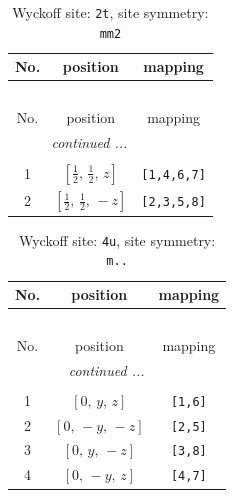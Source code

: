 \documentclass[fleqn,8pt]{jsarticle}
\begin{document}
\renewcommand{\arraystretch}{1.2}
\begin{longtable}{ccc}
\caption{Wyckoff site: {\tt 2t}, site symmetry: {\tt mm2}}
 \\
 \hline \hline
No. & position & mapping \\ \hline \endfirsthead

\multicolumn{2}{l}{\tablename\ \thetable{}} \\
 \hline \hline
No. & position & mapping \\ \hline \endhead

 \hline \hline
\multicolumn{2}{r}{\footnotesize\it continued ...} \\ \endfoot

 \hline \hline
\multicolumn{2}{r}{} \\ \endlastfoot

1 & $\left[ \frac{1}{2},\, \frac{1}{2},\, z \right]$ & {\tt [1,4,6,7]} \\ \hline
2 & $\left[ \frac{1}{2},\, \frac{1}{2},\, - z \right]$ & {\tt [2,3,5,8]} \\
\end{longtable}
\renewcommand{\arraystretch}{1.2}
\begin{longtable}{ccc}
\caption{Wyckoff site: {\tt 4u}, site symmetry: {\tt m..}}
 \\
 \hline \hline
No. & position & mapping \\ \hline \endfirsthead

\multicolumn{2}{l}{\tablename\ \thetable{}} \\
 \hline \hline
No. & position & mapping \\ \hline \endhead

 \hline \hline
\multicolumn{2}{r}{\footnotesize\it continued ...} \\ \endfoot

 \hline \hline
\multicolumn{2}{r}{} \\ \endlastfoot

1 & $\left[ 0,\, y,\, z \right]$ & {\tt [1,6]} \\ \hline
2 & $\left[ 0,\, - y,\, - z \right]$ & {\tt [2,5]} \\ \hline
3 & $\left[ 0,\, y,\, - z \right]$ & {\tt [3,8]} \\ \hline
4 & $\left[ 0,\, - y,\, z \right]$ & {\tt [4,7]} \\
\end{longtable}
\renewcommand{\arraystretch}{1.2}
\end{document}
